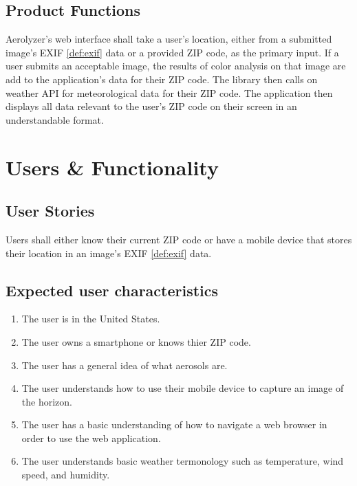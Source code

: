 \documentclass[journal,10pt,draftclsnofoot,onecolumn]{IEEEtran}
\begin{document}
\begin{singlespace}
	\subsection{Product Functions}
		Aerolyzer's web interface shall take a user's location, either from a submitted image's EXIF \ref{def:exif} data or a provided ZIP code, as the primary input.
		If a user submits an acceptable image, the results of color analysis on that image are add to the application's data for their ZIP code.
		The library then calls on weather API for meteorological data for their ZIP code.
		The application then displays all data relevant to the user's ZIP code on their screen in an understandable format.

\clearpage

\section{Users \& Functionality}
	
	\subsection{User Stories}
		Users shall either know their current ZIP code or have a mobile device that stores their location in an image's EXIF \ref{def:exif} data.

	\subsection{Expected user characteristics}
		\begin{enumerate}
			\item The user is in the United States.
			\item The user owns a smartphone or knows thier ZIP code.
			\item The user has a general idea of what aerosols are.
			\item The user understands how to use their mobile device to capture an image of the horizon.
			\item The user has a basic understanding of how to navigate a web browser in order to use the web application.
			\item The user understands basic weather termonology such as temperature, wind speed, and humidity.
		\end{enumerate}


\end{singlespace}
\end{document}
